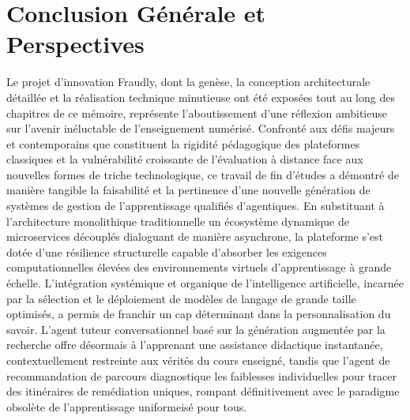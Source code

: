 \section*{Conclusion Générale et Perspectives}

Le projet d'innovation Fraudly, dont la genèse, la conception architecturale détaillée et la réalisation technique minutieuse ont été exposées tout au long des chapitres de ce mémoire, représente l'aboutissement d'une réflexion ambitieuse sur l'avenir inéluctable de l'enseignement numérisé. Confronté aux défis majeurs et contemporains que constituent la rigidité pédagogique des plateformes classiques et la vulnérabilité croissante de l'évaluation à distance face aux nouvelles formes de triche technologique, ce travail de fin d'études a démontré de manière tangible la faisabilité et la pertinence d'une nouvelle génération de systèmes de gestion de l'apprentissage qualifiés d'agentiques. En substituant à l'architecture monolithique traditionnelle un écosystème dynamique de microservices découplés dialoguant de manière asynchrone, la plateforme s'est dotée d'une résilience structurelle capable d'absorber les exigences computationnelles élevées des environnements virtuels d'apprentissage à grande échelle. L'intégration systémique et organique de l'intelligence artificielle, incarnée par la sélection et le déploiement de modèles de langage de grande taille optimisés, a permis de franchir un cap déterminant dans la personnalisation du savoir. L'agent tuteur conversationnel basé sur la génération augmentée par la recherche offre désormais à l'apprenant une assistance didactique instantanée, contextuellement restreinte aux vérités du cours enseigné, tandis que l'agent de recommandation de parcours diagnostique les faiblesses individuelles pour tracer des itinéraires de remédiation uniques, rompant définitivement avec le paradigme obsolète de l'apprentissage uniformeisé pour tous.

